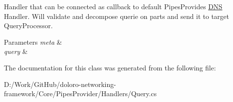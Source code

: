 Handler that can be connected as callback to default Pipes\+Provides \mbox{\hyperlink{class_pipes_provider_1_1_handlers_1_1_d_n_s}{D\+NS}} Handler. Will validate and decompose querie on parts and send it to target Query\+Processor. 


\begin{DoxyParams}{Parameters}
{\em meta} & \\
\hline
{\em query} & \\
\hline
\end{DoxyParams}


The documentation for this class was generated from the following file\+:\begin{DoxyCompactItemize}
\item 
D\+:/\+Work/\+Git\+Hub/doloro-\/networking-\/framework/\+Core/\+Pipes\+Provider/\+Handlers/Query.\+cs\end{DoxyCompactItemize}
